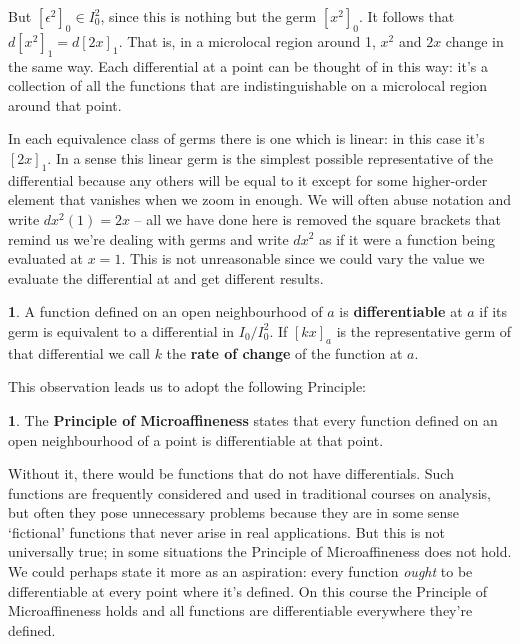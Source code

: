 \documentclass[oneside,english]{amsbook}
\numberwithin{section}{chapter}
\theoremstyle{plain}
\theoremstyle{definition}
\newtheorem{defn}[thm]{\protect\definitionname}
\providecommand{\definitionname}{Definition}
\begin{document}
			But $[\epsilon^2]_0 \in I_0^2$, since this is nothing but the germ $[x^2]_0$. It follows that $d[x^2]_1 = d[2x]_1$. That is, in a microlocal region around 1, $x^2$ and $2x$ change in the same way. Each differential at a point can be thought of in this way: it's a collection of all the functions that are indistinguishable on a microlocal region around that point. 
			
			In each equivalence class of germs there is one which is linear: in this case it's $[2x]_1$. In a sense this linear germ is the simplest possible representative of the differential because any others will be equal to it except for some higher-order element that vanishes when we zoom in enough. We will often abuse notation and write $dx^2(1) = 2x$ -- all we have done here is removed the square brackets that remind us we're dealing with germs and write $dx^2$ as if it were a function being evaluated at $x = 1$. This is not unreasonable since we could vary the value we evaluate the differential at and get different results. 

			\begin{defn}
				A function defined on an open neighbourhood of $a$ is \textbf{differentiable} at $a$ if its germ is equivalent to a differential in $I_0/I_0^2$. If $[kx]_a$ is the representative germ of that differential we call $k$ the \textbf{rate of change} of the function at $a$. 
			\end{defn}
			
			This observation leads us to adopt the following Principle: 

			\begin{defn}
				The \textbf{Principle of Microaffineness} states that every function defined on an open neighbourhood of a point is differentiable at that point. 
			\end{defn}
			
			Without it, there would be functions that do not have differentials. Such functions are frequently considered and used in traditional courses on analysis, but often they pose unnecessary problems because they are in some sense `fictional' functions that never arise in real applications. But this is not universally true; in some situations the Principle of Microaffineness does not hold. We could perhaps state it more as an aspiration: every function \emph{ought} to be differentiable at every point where it's defined. On this course the Principle of Microaffineness holds and all functions are differentiable everywhere they're defined.
\end{document}
